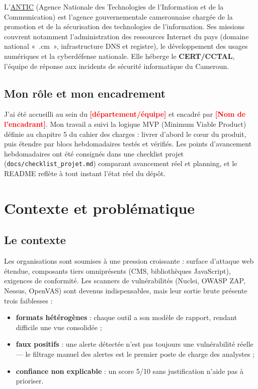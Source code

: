 \documentclass[11pt,a4paper]{report}
\newcommand{\todo}[1]{\textcolor{red}{\textbf{[#1]}}}
\newcommand{\code}[1]{\texttt{#1}}
\begin{document}
L'\href{https://www.antic.cm}{ANTIC} (Agence Nationale des Technologies de l'Information
et de la Communication) est l'agence gouvernementale camerounaise chargée de la promotion
et de la sécurisation des technologies de l'information. Ses missions couvrent notamment
l'administration des ressources Internet du pays (domaine national «~.cm~», infrastructure
DNS et registre), le développement des usages numériques et la cyberdéfense nationale. Elle
héberge le \textbf{CERT/CCTAL}, l'équipe de réponse aux incidents de sécurité informatique
du Cameroun.

\section{Mon rôle et mon encadrement}

J'ai été accueilli au sein du \todo{département/équipe} et encadré par
\todo{Nom de l'encadrant}. Mon travail a suivi la logique MVP (Minimum Viable Product)
définie au chapitre 5 du cahier des charges : livrer d'abord le cœur du produit, puis
étendre par blocs hebdomadaires testés et vérifiés. Les points d'avancement hebdomadaires
ont été consignés dans une checklist projet (\code{docs/checklist\_projet.md}) comparant
avancement réel et planning, et le README reflète à tout instant l'état réel du dépôt.

\chapter{Contexte et problématique}

\section{Le contexte}

Les organisations sont soumises à une pression croissante : surface d'attaque web étendue,
composants tiers omniprésents (CMS, bibliothèques JavaScript), exigences de conformité.
Les scanners de vulnérabilités (Nuclei, OWASP ZAP, Nessus, OpenVAS) sont devenus
indispensables, mais leur sortie brute présente trois faiblesses :

\begin{itemize}[leftmargin=1.5em]
  \item \textbf{formats hétérogènes} : chaque outil a son modèle de rapport, rendant
        difficile une vue consolidée ;
  \item \textbf{faux positifs} : une alerte détectée n'est pas toujours une vulnérabilité
        réelle --- le filtrage manuel des alertes est le premier poste de charge des
        analystes ;
  \item \textbf{confiance non explicable} : un score 5/10 sans justification n'aide pas à
        prioriser.
\end{itemize}
\end{document}
